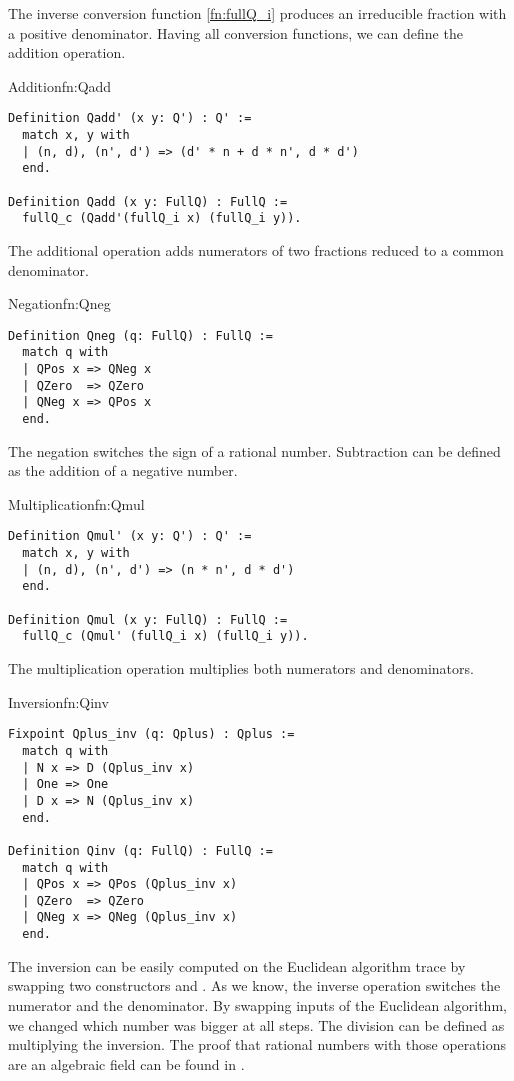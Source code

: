 The inverse conversion function \ref{fn:fullQ_i} produces an irreducible fraction with a positive denominator. Having all conversion functions, we can define the addition operation.
\begin{func}{Addition}{fn:Qadd}
\begin{verbatim}
Definition Qadd' (x y: Q') : Q' :=
  match x, y with
  | (n, d), (n', d') => (d' * n + d * n', d * d')
  end.

Definition Qadd (x y: FullQ) : FullQ :=
  fullQ_c (Qadd'(fullQ_i x) (fullQ_i y)).
\end{verbatim}
\end{func}
The additional operation adds numerators of two fractions reduced to a common denominator.
\begin{func}{Negation}{fn:Qneg}
\begin{verbatim}
Definition Qneg (q: FullQ) : FullQ :=
  match q with
  | QPos x => QNeg x
  | QZero  => QZero
  | QNeg x => QPos x
  end.
\end{verbatim}
\end{func}
The negation switches the sign of a rational number. Subtraction can be defined as the addition of a negative number.
\begin{func}{Multiplication}{fn:Qmul}
\begin{verbatim}
Definition Qmul' (x y: Q') : Q' :=
  match x, y with
  | (n, d), (n', d') => (n * n', d * d')
  end.

Definition Qmul (x y: FullQ) : FullQ :=
  fullQ_c (Qmul' (fullQ_i x) (fullQ_i y)).
\end{verbatim}
\end{func}
The multiplication operation multiplies both numerators and denominators.
\begin{func}[D]{Inversion}{fn:Qinv}
\begin{verbatim}
Fixpoint Qplus_inv (q: Qplus) : Qplus :=
  match q with
  | N x => D (Qplus_inv x)
  | One => One
  | D x => N (Qplus_inv x)
  end.

Definition Qinv (q: FullQ) : FullQ :=
  match q with
  | QPos x => QPos (Qplus_inv x)
  | QZero  => QZero
  | QNeg x => QNeg (Qplus_inv x)
  end.
\end{verbatim}
\end{func}
The inversion can be easily computed on the Euclidean algorithm trace by swapping two constructors  and . As we know, the inverse operation switches the numerator and the denominator. By swapping inputs of the Euclidean algorithm, we changed which number was bigger at all steps. The division can be defined as multiplying the inversion. The proof that rational numbers with those operations are an algebraic field can be found in .
